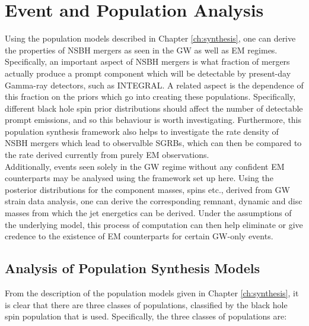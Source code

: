 \chapter{Event and Population Analysis}\label{ch:analysis}

    Using the population models described in Chapter \ref{ch:synthesis}, one can derive
    the properties of NSBH mergers as seen in the GW as well as EM regimes.
    Specifically, an important aspect of NSBH mergers is what fraction of mergers
    actually produce a prompt component which will be detectable by present-day
    Gamma-ray detectors, such as INTEGRAL. A related aspect is the dependence of this
    fraction on the priors which go into creating these populations. Specifically,
    different black hole spin prior distributions should affect the number of detectable
    prompt emissions, and so this behaviour is worth investigating.  Furthermore, this
    population synthesis framework also helps to investigate the rate density of NSBH
    mergers which lead to observalble SGRBs, which can then be compared to the rate
    derived currently from purely EM observations.\\
    Additionally, events seen solely in the GW regime without any confident EM
    counterparts may be analysed using the framework set up here. Using the posterior
    distributions for the component masses, spins etc., derived from GW strain data
    analysis, one can derive the corresponding remnant, dynamic and disc masses from
    which the jet energetics can be derived. Under the assumptions of the underlying
    model, this process of computation can then help eliminate or give credence to the
    existence of EM counterparts for certain GW-only events.

\section{Analysis of Population Synthesis Models}

    From the description of the population models given in Chapter \ref{ch:synthesis},
    it is clear that there are three classes of populations, classified by the black
    hole spin population that is used. Specifically, the three classes of populations
    are:

